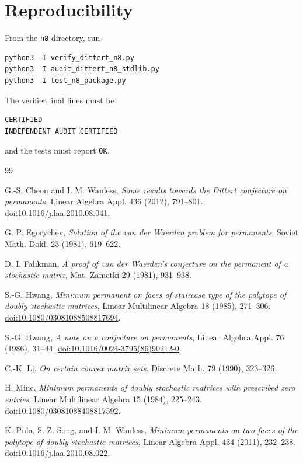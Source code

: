 \documentclass[11pt]{article}
\theoremstyle{remark}
\begin{document}
\section*{Reproducibility}

From the \texttt{n8} directory, run
\begin{verbatim}
python3 -I verify_dittert_n8.py
python3 -I audit_dittert_n8_stdlib.py
python3 -I test_n8_package.py
\end{verbatim}
The verifier final lines must be
\begin{verbatim}
CERTIFIED
INDEPENDENT AUDIT CERTIFIED
\end{verbatim}
and the tests must report \texttt{OK}.

\begin{thebibliography}{99}

G.-S. Cheon and I. M. Wanless,
\emph{Some results towards the Dittert conjecture on permanents},
Linear Algebra Appl. 436 (2012), 791--801.
\href{https://doi.org/10.1016/j.laa.2010.08.041}{doi:10.1016/j.laa.2010.08.041}.

G. P. Egorychev,
\emph{Solution of the van der Waerden problem for permanents},
Soviet Math. Dokl. 23 (1981), 619--622.

D. I. Falikman,
\emph{A proof of van der Waerden's conjecture on the permanent of a stochastic matrix},
Mat. Zametki 29 (1981), 931--938.

S.-G. Hwang,
\emph{Minimum permanent on faces of staircase type of the polytope of doubly stochastic matrices},
Linear Multilinear Algebra 18 (1985), 271--306.
\href{https://doi.org/10.1080/03081088508817694}{doi:10.1080/03081088508817694}.

S.-G. Hwang,
\emph{A note on a conjecture on permanents},
Linear Algebra Appl. 76 (1986), 31--44.
\href{https://doi.org/10.1016/0024-3795(86)90212-0}{doi:10.1016/0024-3795(86)90212-0}.

C.-K. Li,
\emph{On certain convex matrix sets},
Discrete Math. 79 (1990), 323--326.

H. Minc,
\emph{Minimum permanents of doubly stochastic matrices with prescribed zero entries},
Linear Multilinear Algebra 15 (1984), 225--243.
\href{https://doi.org/10.1080/03081088408817592}{doi:10.1080/03081088408817592}.

K. Pula, S.-Z. Song, and I. M. Wanless,
\emph{Minimum permanents on two faces of the polytope of doubly stochastic matrices},
Linear Algebra Appl. 434 (2011), 232--238.
\href{https://doi.org/10.1016/j.laa.2010.08.022}{doi:10.1016/j.laa.2010.08.022}.

\end{thebibliography}
\end{document}
